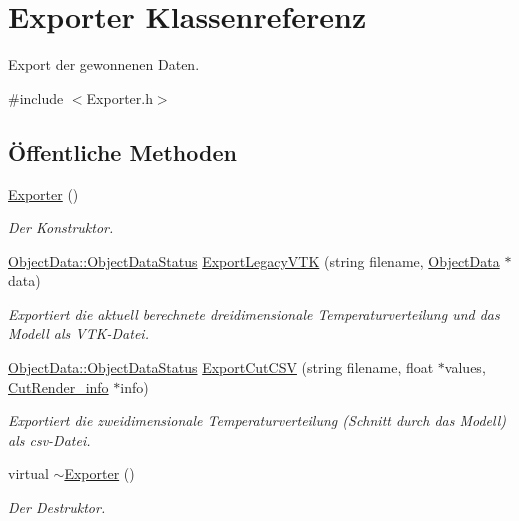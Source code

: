 \hypertarget{classExporter}{\section{Exporter Klassenreferenz}
\label{classExporter}
}


Export der gewonnenen Daten.  




{\ttfamily \#include $<$Exporter.\-h$>$}

\subsection*{Öffentliche Methoden}
\begin{DoxyCompactItemize}
\item 
\hyperlink{classExporter_a2a977cb5ac8f637fcb570e73f650eca0}{Exporter} ()
\begin{DoxyCompactList}\small\item\em Der Konstruktor. \end{DoxyCompactList}\item 
\hyperlink{classObjectData_a20e8cd3cd0f8af3b571b9393aa9e6484}{Object\-Data\-::\-Object\-Data\-Status} \hyperlink{classExporter_a59d03f0a582498e15397230b70ad1e80}{Export\-Legacy\-V\-T\-K} (string filename, \hyperlink{classObjectData}{Object\-Data} $\ast$data)
\begin{DoxyCompactList}\small\item\em Exportiert die aktuell berechnete dreidimensionale Temperaturverteilung und das Modell als V\-T\-K-\/\-Datei. \end{DoxyCompactList}\item 
\hyperlink{classObjectData_a20e8cd3cd0f8af3b571b9393aa9e6484}{Object\-Data\-::\-Object\-Data\-Status} \hyperlink{classExporter_ae2aa06b8c8c77e172801a1f77800ffd0}{Export\-Cut\-C\-S\-V} (string filename, float $\ast$values, \hyperlink{structUtils_1_1CutRender__info}{Cut\-Render\-\_\-info} $\ast$info)
\begin{DoxyCompactList}\small\item\em Exportiert die zweidimensionale Temperaturverteilung (Schnitt durch das Modell) als csv-\/\-Datei. \end{DoxyCompactList}\item 
virtual \hyperlink{classExporter_a44f24686958e01a543fd8b68b392658a}{$\sim$\-Exporter} ()
\begin{DoxyCompactList}\small\item\em Der Destruktor. \end{DoxyCompactList}\end{DoxyCompactItemize}


